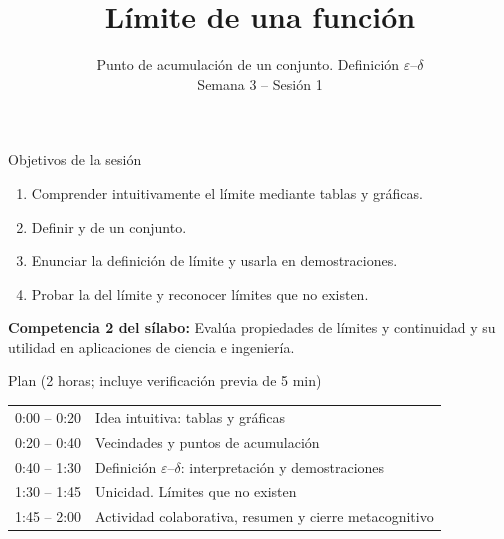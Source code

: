 \documentclass[10pt,aspectratio=169]{beamer}
\title[Límite de una función]{Límite de una función}
\subtitle{Punto de acumulación de un conjunto. Definición $\varepsilon$--$\delta$\\[2pt]\small Semana 3 -- Sesión 1}
\begin{document}
\begin{frame}
  \titlepage
\end{frame}

\begin{frame}{Objetivos de la sesión}
  \begin{enumerate}
    \item Comprender intuitivamente el límite mediante tablas y gráficas.
    \item Definir  y  de un conjunto.
    \item Enunciar la definición \resaltar{$\varepsilon$--$\delta$} de límite y usarla en demostraciones.
    \item Probar la  del límite y reconocer límites que no existen.
  \end{enumerate}
  \vspace{1mm}
  {\small\textbf{Competencia 2 del sílabo:} Evalúa propiedades de límites y continuidad y su utilidad en aplicaciones de ciencia e ingeniería.}
  \begin{block}{Plan (2 horas; incluye verificación previa de 5 min)}
    \begin{tabular}{ll}
      0:00 -- 0:20 & Idea intuitiva: tablas y gráficas\\
      0:20 -- 0:40 & Vecindades y puntos de acumulación\\
      0:40 -- 1:30 & Definición $\varepsilon$--$\delta$: interpretación y demostraciones\\
      1:30 -- 1:45 & Unicidad. Límites que no existen\\
      1:45 -- 2:00 & Actividad colaborativa, resumen y cierre metacognitivo
    \end{tabular}
  \end{block}
\end{frame}
\end{document}
